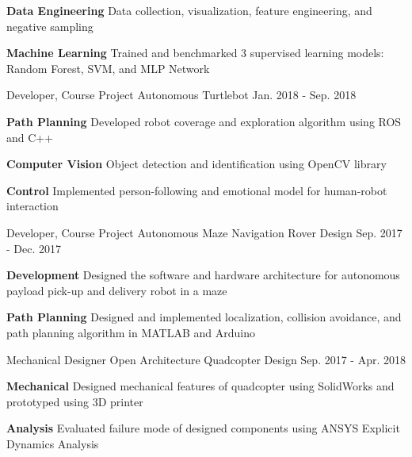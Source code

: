 \begin{cventries}
{\begin{cvitems}
			\item {\textbf{Data Engineering} Data collection, visualization, feature engineering, and negative sampling}
			\item {\textbf{Machine Learning} Trained and benchmarked 3 supervised learning models: Random Forest, SVM, and MLP Network}
		\end{cvitems}
	}
	\cventry
	{Developer, Course Project}
	{Autonomous Turtlebot}
	{Jan. 2018 - Sep. 2018}
	{}
	{
		\begin{cvitems}
			\item {\textbf{Path Planning} Developed robot coverage and exploration algorithm using ROS and C++}
			\item {\textbf{Computer Vision} Object detection and identification using OpenCV library}
			\item {\textbf{Control} Implemented person-following and emotional model for human-robot interaction}
		\end{cvitems}
	}
	\cventry
	{Developer, Course Project}
	{Autonomous Maze Navigation Rover Design}
	{Sep. 2017 - Dec. 2017}
	{}
	{
		\begin{cvitems}
			\item { \textbf{Development} Designed the software and hardware architecture for autonomous payload pick-up and delivery robot in a maze}
			\item { \textbf{Path Planning} Designed and implemented localization, collision avoidance, and path planning algorithm in MATLAB and Arduino}
		\end{cvitems}
	}
	\cventry
	{Mechanical Designer}
	{Open Architecture Quadcopter Design}
	{Sep. 2017 - Apr. 2018}
	{}
	{
		\begin{cvitems}
			\item {\textbf{Mechanical} Designed mechanical features of quadcopter using SolidWorks and prototyped using 3D printer}
			\item {\textbf{Analysis} Evaluated failure mode of designed components using ANSYS Explicit Dynamics Analysis}
		\end{cvitems}
	}
\end{cventries}
